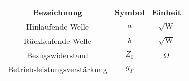 %
\begin{center}
\begin{tabular}{ccc} \toprule
Bezeichnung & Symbol & Einheit \\ \midrule
Hinlaufende Welle & $a$ & $\sqrt{\si{\watt}}$ \\
Rücklaufende Welle & $b$ & $\sqrt{\si{\watt}}$ \\
Bezugswiderstand & $Z_0$ & \si{\ohm} \\
Betriebsleistungsverstärkung & $g_T$ & \\
\bottomrule
\end{tabular}

\begin{tikzpicture}[scale=0.5, every node/.style={scale=1}]

\end{tikzpicture}
\end{center}

